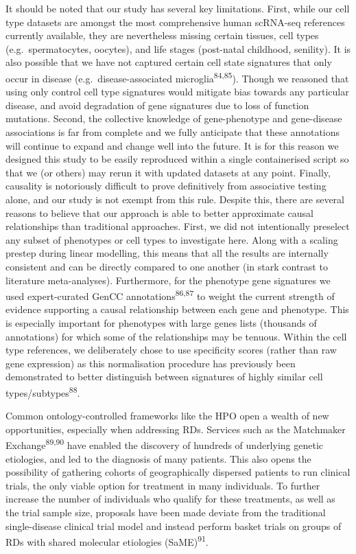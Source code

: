 \documentclass[
]{article}
\begin{document}
It should be noted that our study has several key limitations. First,
while our cell type datasets are amongst the most comprehensive human
scRNA-seq references currently available, they are nevertheless missing
certain tissues, cell types (e.g.~spermatocytes, oocytes), and life
stages (post-natal childhood, senility). It is also possible that we
have not captured certain cell state signatures that only occur in
disease (e.g.~disease-associated microglia\textsuperscript{84,85}).
Though we reasoned that using only control cell type signatures would
mitigate bias towards any particular disease, and avoid degradation of
gene signatures due to loss of function mutations. Second, the
collective knowledge of gene-phenotype and gene-disease associations is
far from complete and we fully anticipate that these annotations will
continue to expand and change well into the future. It is for this
reason we designed this study to be easily reproduced within a single
containerised script so that we (or others) may rerun it with updated
datasets at any point. Finally, causality is notoriously difficult to
prove definitively from associative testing alone, and our study is not
exempt from this rule. Despite this, there are several reasons to
believe that our approach is able to better approximate causal
relationships than traditional approaches. First, we did not
intentionally preselect any subset of phenotypes or cell types to
investigate here. Along with a scaling prestep during linear modelling,
this means that all the results are internally consistent and can be
directly compared to one another (in stark contrast to literature
meta-analyses). Furthermore, for the phenotype gene signatures we used
expert-curated GenCC annotations\textsuperscript{86,87} to weight the
current strength of evidence supporting a causal relationship between
each gene and phenotype. This is especially important for phenotypes
with large genes lists (thousands of annotations) for which some of the
relationships may be tenuous. Within the cell type references, we
deliberately chose to use specificity scores (rather than raw gene
expression) as this normalisation procedure has previously been
demonstrated to better distinguish between signatures of highly similar
cell types/subtypes\textsuperscript{88}.

Common ontology-controlled frameworks like the HPO open a wealth of new
opportunities, especially when addressing RDs. Services such as the
Matchmaker Exchange\textsuperscript{89,90} have enabled the discovery of
hundreds of underlying genetic etiologies, and led to the diagnosis of
many patients. This also opens the possibility of gathering cohorts of
geographically dispersed patients to run clinical trials, the only
viable option for treatment in many individuals. To further increase the
number of individuals who qualify for these treatments, as well as the
trial sample size, proposals have been made deviate from the traditional
single-disease clinical trial model and instead perform basket trials on
groups of RDs with shared molecular etiologies
(SaME)\textsuperscript{91}.
\end{document}
